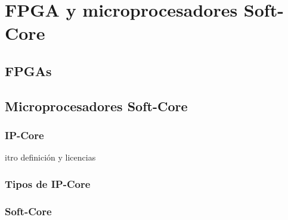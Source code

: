 
\chapter{FPGA y microprocesadores Soft-Core}
	

\section{FPGAs}
		
\section{Microprocesadores Soft-Core}
		\subsection{ IP-Core}
itro definición y licencias
		\subsection{Tipos de IP-Core}
		\subsection{Soft-Core}%

